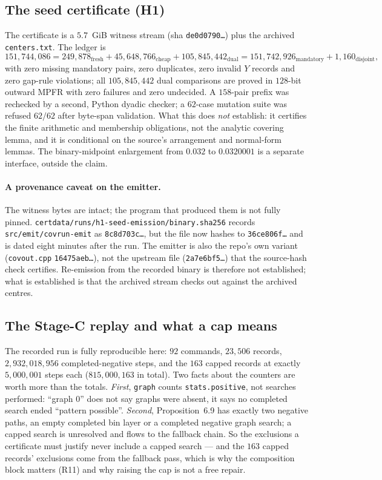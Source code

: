 \documentclass[10pt]{article}
\theoremstyle{definition}
\newcommand{\file}[1]{\texttt{\small #1}}
\begin{document}
\subsection{The seed certificate (H1)}\label{sec:h1}
The certificate is a $5.7$~GiB witness stream (sha \texttt{de0d0790\ldots}) plus the archived
\file{centers.txt}. The ledger is
\[
151{,}744{,}086=249{,}878_{\text{fresh}}+45{,}648{,}766_{\text{cheap}}+105{,}845{,}442_{\text{dual}}
=151{,}742{,}926_{\text{mandatory}}+1{,}160_{\text{disjoint}} ,
\]
with zero missing mandatory pairs, zero duplicates, zero invalid $Y$ records and zero gap-rule
violations; all $105{,}845{,}442$ dual comparisons are proved in $128$-bit outward MPFR \cite{mpfr} with zero
failures and zero undecided. A $158$-pair prefix was rechecked by a second, Python dyadic checker; a
$62$-case mutation suite was refused $62/62$ after byte-span validation. What this does \emph{not}
establish: it certifies the finite arithmetic and membership obligations, not the analytic covering
lemma, and it is conditional on the source's arrangement and normal-form lemmas. The binary-midpoint
enlargement from $0.032$ to $0.0320001$ is a separate interface, outside the claim.

\paragraph{A provenance caveat on the emitter.} The witness bytes are intact; the program that produced
them is not fully pinned. \file{certdata/runs/h1-seed-emission/binary.sha256} records
\file{src/emit/covrun-emit} as \texttt{8c8d703c\ldots}, but the file now hashes to
\texttt{36ce806f\ldots} and is dated eight minutes after the run. The emitter is also the repo's own
variant (\file{covout.cpp} \texttt{16475aeb\ldots}), not the upstream file (\texttt{2a7e6bf5\ldots}) that
the source-hash check certifies. Re-emission from the recorded binary is therefore not established;
what is established is that the archived stream checks out against the archived centres.

\subsection{The Stage-C replay and what a cap means}\label{sec:stagec}
The recorded run is fully reproducible here: $92$ commands, $23{,}506$ records, $2{,}932{,}018{,}956$
completed-negative steps, and the $163$ capped records at exactly $5{,}000{,}001$ steps each
($815{,}000{,}163$ in total). Two facts about the counters are worth more than the totals.
\emph{First}, \file{graph} counts \texttt{stats.positive}, not searches performed: ``graph 0'' does not
say graphs were absent, it says no completed search ended ``pattern possible''. \emph{Second},
Proposition~6.9 has exactly two negative paths, an empty completed bin layer or a completed negative
graph search; a capped search is unresolved and flows to the fallback chain. So the exclusions a
certificate must justify never include a capped search --- and the $163$ capped records' exclusions come
from the fallback pass, which is why the composition block matters (R11) and why raising the cap is not
a free repair.
\end{document}

